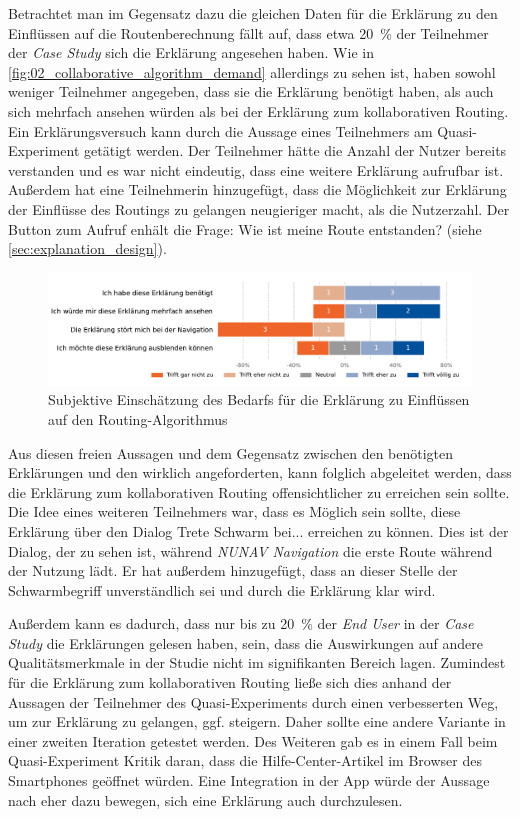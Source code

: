 Betrachtet man im Gegensatz dazu die gleichen Daten für die Erklärung zu den Einflüssen auf die Routenberechnung fällt auf, dass etwa 20~\% der Teilnehmer der \textit{Case Study} sich die Erklärung angesehen haben. Wie in \autoref{fig:02_collaborative_algorithm_demand} allerdings zu sehen ist, haben sowohl weniger Teilnehmer angegeben, dass sie die Erklärung benötigt haben, als auch sich mehrfach ansehen würden als bei der Erklärung zum kollaborativen Routing. Ein Erklärungsversuch kann durch die Aussage eines Teilnehmers am Quasi-Experiment getätigt werden. Der Teilnehmer hätte die Anzahl der Nutzer bereits verstanden und es war nicht eindeutig, dass eine weitere Erklärung aufrufbar ist. Außerdem hat eine Teilnehmerin hinzugefügt, dass die Möglichkeit zur Erklärung der Einflüsse des Routings zu gelangen neugieriger macht, als die Nutzerzahl. Der Button zum Aufruf enhält die Frage: \glqq Wie ist meine Route entstanden?\grqq{} (siehe \autoref{sec:explanation_design}).

\begin{figure}[htb!]
    \centering
    \includegraphics[width=\textwidth]{contents/06_model_evaluation/02_evaluation/res/qualitativeFeedback-02_collaborative_algorithm_demand.pdf}
    \caption{Subjektive Einschätzung des Bedarfs für die Erklärung zu Einflüssen auf den Routing-Algorithmus}
    \label{fig:02_collaborative_algorithm_demand}
\end{figure}

Aus diesen freien Aussagen und dem Gegensatz zwischen den benötigten Erklärungen und den wirklich angeforderten, kann folglich abgeleitet werden, dass die Erklärung zum kollaborativen Routing offensichtlicher zu erreichen sein sollte. Die Idee eines weiteren Teilnehmers war, dass es Möglich sein sollte, diese Erklärung über den Dialog \glqq Trete Schwarm bei...\grqq{} erreichen zu können. Dies ist der Dialog, der zu sehen ist, während \textit{NUNAV Navigation} die erste Route während der Nutzung lädt. Er hat außerdem hinzugefügt, dass an dieser Stelle der Schwarmbegriff unverständlich sei und durch die Erklärung klar wird.

Außerdem kann es dadurch, dass nur bis zu 20~\% der \textit{End User} in der \textit{Case Study} die Erklärungen gelesen haben, sein, dass die Auswirkungen auf andere Qualitätsmerkmale in der Studie nicht im signifikanten Bereich lagen. Zumindest für die Erklärung zum kollaborativen Routing ließe sich dies anhand der Aussagen der Teilnehmer des Quasi-Experiments durch einen verbesserten Weg, um zur Erklärung zu gelangen, ggf. steigern. Daher sollte eine andere Variante in einer zweiten Iteration getestet werden. Des Weiteren gab es in einem Fall beim Quasi-Experiment Kritik daran, dass die Hilfe-Center-Artikel im Browser des Smartphones geöffnet würden. Eine Integration in der App würde der Aussage nach eher dazu bewegen, sich eine Erklärung auch durchzulesen.

